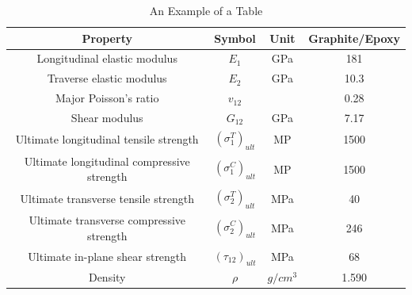 \documentclass{article}
\begin{document}
\begin{table}
\caption{An Example of a Table}
\label{T300/5308 material properties}
\centering
\begin{tabular}{cccc}
	\toprule
	Property								   & Symbol				  & Unit  &  Graphite/Epoxy     \\
	\midrule
	Longitudinal elastic modulus			   & $E_1$				  & GPa   &  181                 \\
	Traverse elastic modulus				   & $E_2$				  & GPa   &  10.3                \\
	Major Poisson's ratio					   & $v_{12}$			  &       &  0.28                \\
	Shear modulus							   & $G_{12}$			  & GPa   &  7.17                \\
	Ultimate longitudinal tensile strength     & $(\sigma_1^T)_{ult}$ & MP    &  1500                 \\
	Ultimate longitudinal compressive strength & $(\sigma_1^C)_{ult}$ & MP    &  1500                 \\
	Ultimate transverse tensile strength       & $(\sigma_2^T)_{ult}$ & MPa   &  40                   \\
	Ultimate transverse compressive strength   & $(\sigma_2^C)_{ult}$ & MPa   &  246                   \\
	Ultimate in-plane shear strength           & $(\tau_{12})_{ult}$  & MPa   &  68                    \\
	Density                                    & $\rho$               & $g/cm^3$ &  1.590                    \\
	\bottomrule
\end{tabular}
\end{table}


\end{document}
